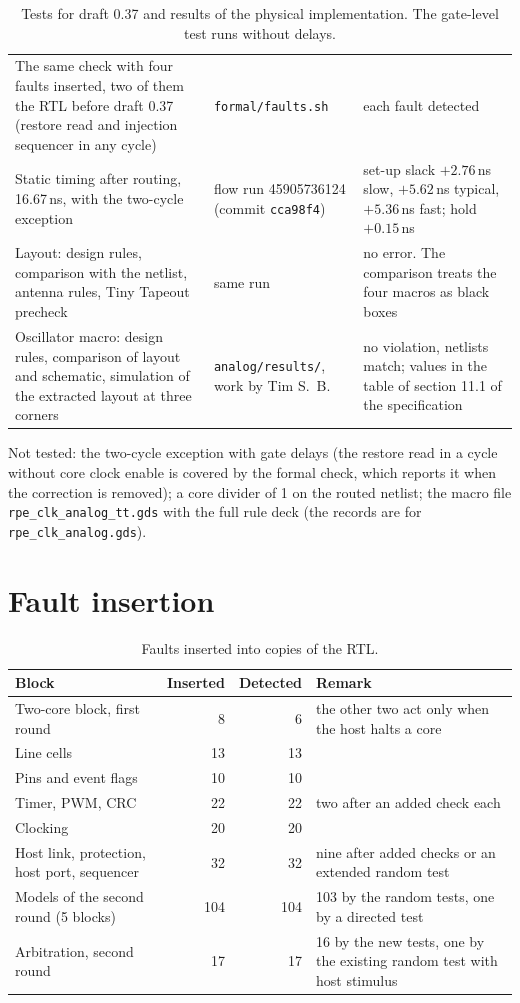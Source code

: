 \documentclass[10pt,a4paper]{article}
\begin{document}
\begin{table}[H]
\begin{tabularx}{\linewidth}{@{}LLL@{}}
The same check with four faults inserted, two of them the RTL before draft 0.37 (restore read and injection sequencer in any cycle) & \texttt{formal/faults.sh} & each fault detected \\
Static timing after routing, 16.67\,ns, with the two-cycle exception & flow run 45905736124 (commit \texttt{cca98f4}) & set-up slack $+2.76$\,ns slow, $+5.62$\,ns typical, $+5.36$\,ns fast; hold $+0.15$\,ns \\
Layout: design rules, comparison with the netlist, antenna rules, Tiny Tapeout precheck & same run & no error. The comparison treats the four macros as black boxes \\
Oscillator macro: design rules, comparison of layout and schematic, simulation of the extracted layout at three corners & \texttt{analog/results/}, work by Tim S.\ B. & no violation, netlists match; values in the table of section 11.1 of the specification \\
\bottomrule
\end{tabularx}
\caption{Tests for draft 0.37 and results of the physical implementation. The gate-level test runs without
delays.}
\end{table}

Not tested: the two-cycle exception with gate delays (the restore read in a cycle without core clock enable is
covered by the formal check, which reports it when the correction is removed); a core divider of 1 on the routed netlist; the macro file
\texttt{rpe\_clk\_analog\_tt.gds} with the full rule deck (the records are for \texttt{rpe\_clk\_analog.gds}).

\section{Fault insertion}

\begin{table}[H]
\centering\small
\begin{tabularx}{\linewidth}{@{}Lrrl@{}}
\toprule
Block & Inserted & Detected & Remark \\
\midrule
Two-core block, first round & 8 & 6 & the other two act only when the host halts a core \\
Line cells & 13 & 13 & \\
Pins and event flags & 10 & 10 & \\
Timer, PWM, CRC & 22 & 22 & two after an added check each \\
Clocking & 20 & 20 & \\
Host link, protection, host port, sequencer & 32 & 32 & nine after added checks or an extended random test \\
Models of the second round (5 blocks) & 104 & 104 & 103 by the random tests, one by a directed test \\
Arbitration, second round & 17 & 17 & 16 by the new tests, one by the existing random test with host stimulus \\
\bottomrule
\end{tabularx}
\caption{Faults inserted into copies of the RTL.}
\end{table}
\end{document}
